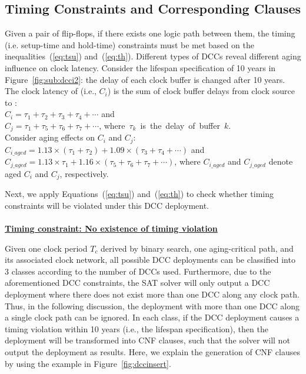 \subsection{Timing Constraints and Corresponding Clauses}
\label{subsec:tccc}
Given a pair of flip-flops, if there exists one logic path between them, the timing (i.e. setup-time and hold-time) constraints must be met based on the inequalities~(\ref{eq:tsu}) and~(\ref{eq:th}). Different types of DCCs reveal different aging influence on clock latency. Consider the lifespan specification of 10 years in Figure~\ref{fig:sub:dcci2}: the delay of each clock buffer is changed after 10 years. The clock latency of  (i.e., $C_i$) is the sum of clock buffer delays from clock source to : \\
$C_i = \tau_1 + \tau_2 + \tau_3 + \tau_4 +\dotsb$ and \\
$C_j = \tau_1 + \tau_5 + \tau_6 + \tau_7 +\dotsb$, \mbox{\fontsize{9}{10.8}\selectfont where $\tau_k$ is the delay of buffer $k$.}\\
Consider aging effects on $C_i$ and $C_j$: \\
$C_{i\_aged} = 1.13 \times \left(\tau_1 + \tau_2\right) + 1.09 \times \left(\tau_3 + \tau_4 + \dotsb\right)$ and \\
$C_{j\_aged} = 1.13 \times \tau_1+ 1.16 \times \left( \tau_5 + \tau_6 + \tau_7 + \dotsb \right)$, where $C_{i\_aged}$ and $C_{j\_aged}$ denote aged $C_i$ and $C_j$, respectively.

Next, we apply Equations~(\ref{eq:tsu}) and~(\ref{eq:th}) to check whether timing constraints will be violated under this DCC deployment.\\ \\
\textbf{\uline{Timing constraint: No existence of timing violation}}

Given one clock period $T_c$ derived by binary search, one aging-critical path, and its associated clock network, all possible DCC deployments can be classified into 3 classes according to the number of DCCs used. Furthermore, due to the aforementioned DCC constraints, the SAT solver will only output a DCC deployment where there does not exist more than one DCC along any clock path. Thus, in the following discussion, the deployment with more than one DCC along a single clock path can be ignored. In each class, if the DCC deployment causes a timing violation within 10 years (i.e., the lifespan specification), then the deployment will be transformed into CNF clauses, such that the solver will not output the deployment as results. Here, we explain the generation of CNF clauses by using the example in Figure~\ref{fig:dccinsert}.

